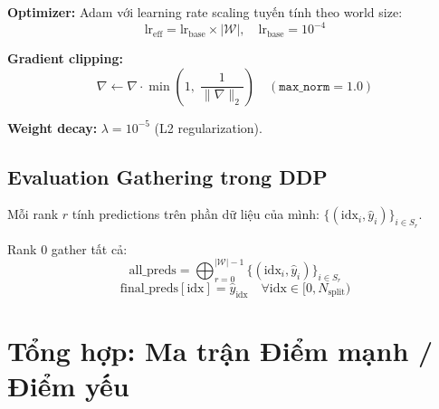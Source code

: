 \documentclass[12pt,a4paper]{article}
\begin{document}
\begin{mathbox}[title={Cấu hình tối ưu hóa}]
\textbf{Optimizer:} Adam với learning rate scaling tuyến tính theo world size:
\begin{equation}
  \text{lr}_\text{eff} = \text{lr}_\text{base} \times |\mathcal{W}|,
  \quad \text{lr}_\text{base} = 10^{-4}
\end{equation}

\textbf{Gradient clipping:}
\begin{equation}
  \nabla \leftarrow \nabla \cdot \min\!\left(1,\; \frac{1}{\|\nabla\|_2}\right)
  \quad (\texttt{max\_norm} = 1.0)
\end{equation}

\textbf{Weight decay:} $\lambda = 10^{-5}$ (L2 regularization).
\end{mathbox}

\subsection{Evaluation Gathering trong DDP}

\begin{mathbox}[title={Phương pháp gather kết quả phân tán}]
Mỗi rank $r$ tính predictions trên phần dữ liệu của mình:
$\{(\text{idx}_i, \hat{y}_i)\}_{i \in S_r}$.

Rank 0 gather tất cả:
\begin{equation}
  \text{all\_preds} = \bigoplus_{r=0}^{|\mathcal{W}|-1}
    \{(\text{idx}_i, \hat{y}_i)\}_{i \in S_r}
\end{equation}
\begin{equation}
  \text{final\_preds}[\text{idx}] = \hat{y}_{\text{idx}}
  \quad \forall \text{idx} \in [0, N_\text{split})
\end{equation}
\end{mathbox}

\section{Tổng hợp: Ma trận Điểm mạnh / Điểm yếu}
\end{document}
